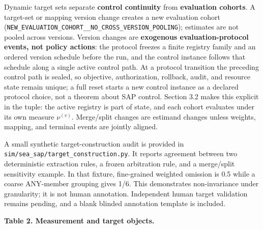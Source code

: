 \documentclass[
  11pt]{article}
\begin{document}
Dynamic target sets separate \textbf{control continuity} from
\textbf{evaluation cohorts}. A target-set or mapping version change
creates a new evaluation cohort
(\texttt{NEW\_EVALUATION\_COHORT\_\_NO\_CROSS\_VERSION\_POOLING});
estimates are not pooled across versions. Version changes are
\textbf{exogenous evaluation-protocol events, not policy actions}: the
protocol freezes a finite registry family and an ordered version
schedule before the run, and the control instance follows that schedule
along a single active control path. At a protocol transition the
preceding control path is sealed, so objective, authorization, rollback,
audit, and resource state remain unique; a full reset starts a new
control instance as a declared protocol choice, not a theorem about SAP
control. Section 3.2 makes this explicit in the tuple: the active
registry is part of state, and each cohort evaluates under its own
measure \(\nu^{(v)}\). Merge/split changes are estimand changes unless
weights, mapping, and terminal events are jointly aligned.

A small synthetic target-construction audit is provided in
\texttt{sim/sea\_sap/target\_construction.py}. It reports agreement
between two deterministic extraction rules, a frozen arbitration rule,
and a merge/split sensitivity example. In that fixture, fine-grained
weighted omission is 0.5 while a coarse ANY-member grouping gives 1/6.
This demonstrates non-invariance under granularity; it is not human
annotation. Independent human target validation remains pending, and a
blank blinded annotation template is included.

\textbf{Table 2. Measurement and target objects.}
\end{document}
